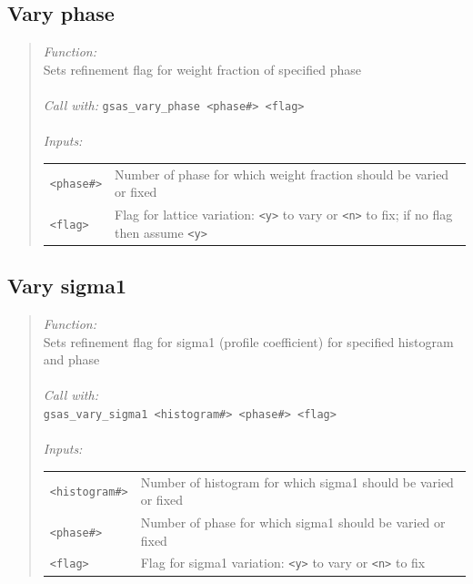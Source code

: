 \documentclass{article}
\begin{document}
\subsection{Vary phase}
\begin{quote}
\textit{Function:} \\
Sets refinement flag for weight fraction of specified phase  \\ \\
\textit{Call with:}
\texttt{gsas\_vary\_phase <phase\#> <flag>} \\ \\ 
\textit{Inputs:} \\
\begin{tabular}[t]{l l}
\texttt{<phase\#>} &  Number of phase for which weight fraction should be varied or fixed \\ 
\texttt{<flag>} & Flag for lattice variation: \texttt{<y>} to vary or \texttt{<n>} to fix; if no flag then assume \texttt{<y>} \\ 
\end{tabular}
\end{quote}


\subsection{Vary sigma1}
\begin{quote}
\textit{Function:} \\
Sets refinement flag for sigma1 (profile coefficient) for specified histogram and phase \\ \\  
\textit{Call with:}\\
\texttt{gsas\_vary\_sigma1 <histogram\#> <phase\#> <flag>} \\ \\
\textit{Inputs:}\\
\begin{tabular}[t]{l l}
\texttt{<histogram\#>} &  Number of histogram for which sigma1 should be varied or fixed \\
\texttt{<phase\#>} &  Number of phase for which sigma1 should be varied or fixed \\
\texttt{<flag>} &  Flag for sigma1 variation: \texttt{<y>} to vary or \texttt{<n>} to fix  \\
\end{tabular}
\end{quote}
\end{document}
